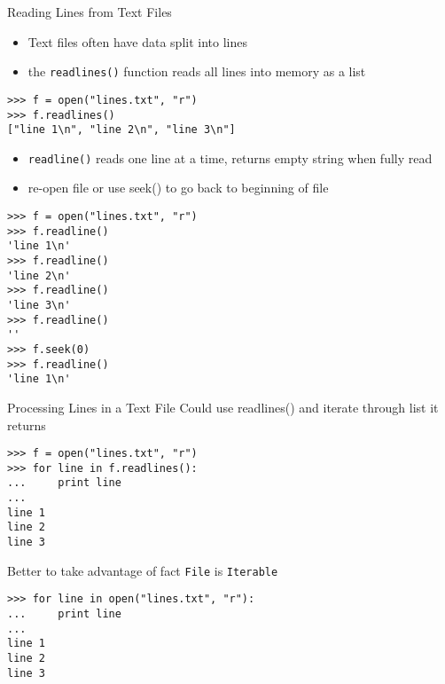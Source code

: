 \documentclass[smaller, aspectratio=1610]{beamer}
\begin{document}
\begin{frame}[label={sec:org72db822},fragile]{Reading Lines from Text Files}
 \begin{itemize}
\item Text files often have data split into lines
\item the \texttt{readlines()} function reads all lines into memory as a list
\end{itemize}

\lstset{language=Python,label= ,caption= ,captionpos=b,numbers=none}
\begin{lstlisting}
>>> f = open("lines.txt", "r")
>>> f.readlines()
["line 1\n", "line 2\n", "line 3\n"]
\end{lstlisting}

\begin{itemize}
\item \texttt{readline()} reads one line at a time, returns empty string when fully read
\item re-open file or use seek() to go back to beginning of file
\end{itemize}

\lstset{language=Python,label= ,caption= ,captionpos=b,numbers=none}
\begin{lstlisting}
>>> f = open("lines.txt", "r")
>>> f.readline()
'line 1\n'
>>> f.readline()
'line 2\n'
>>> f.readline()
'line 3\n'
>>> f.readline()
''
>>> f.seek(0)
>>> f.readline()
'line 1\n'
\end{lstlisting}
\end{frame}

\begin{frame}[label={sec:orge553b71},fragile]{Processing Lines in a Text File}
 Could use readlines() and iterate through list it returns

\lstset{language=Python,label= ,caption= ,captionpos=b,numbers=none}
\begin{lstlisting}
>>> f = open("lines.txt", "r")
>>> for line in f.readlines():
...     print line
...
line 1
line 2
line 3
\end{lstlisting}

Better to take advantage of fact \texttt{File} is \texttt{Iterable}

\lstset{language=Python,label= ,caption= ,captionpos=b,numbers=none}
\begin{lstlisting}
>>> for line in open("lines.txt", "r"):
...     print line
...
line 1
line 2
line 3
\end{lstlisting}
\end{frame}
\end{document}
